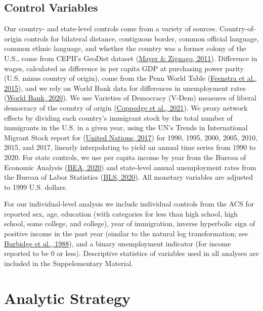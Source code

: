 \documentclass[
  11pt,
]{article}
\begin{document}
\hypertarget{control-variables}{%
\subsection{Control Variables}\label{control-variables}}

Our country- and state-level controls come from a variety of sources. Country-of-origin controls for bilateral distance, contiguous border, common official language, common ethnic language, and whether the country was a former colony of the U.S., come from CEPII's GeoDist dataset (\protect\hyperlink{ref-mayer_2011}{Mayer \& Zignago, 2011}). Difference in wages, calculated as difference in per capita GDP at purchasing power parity (U.S. minus country of origin), come from the Penn World Table (\protect\hyperlink{ref-feenstra_2015}{Feenstra et al., 2015}), and we rely on World Bank data for differences in unemployment rates (\protect\hyperlink{ref-worldbank_2020}{World Bank, 2020}). We use Varieties of Democracy (V-Dem) measures of liberal democracy of the country of origin (\protect\hyperlink{ref-coppedge_2021}{Coppedge et al., 2021}). We proxy network effects by dividing each country's immigrant stock by the total number of immigrants in the U.S. in a given year, using the UN's Trends in International Migrant Stock report for (\protect\hyperlink{ref-unitednations_2017}{United Nations, 2017}) for 1990, 1995, 2000, 2005, 2010, 2015, and 2017, linearly interpolating to yield an annual time series from 1990 to 2020. For state controls, we use per capita income by year from the Bureau of Economic Analysis (\protect\hyperlink{ref-bea_2020}{BEA, 2020}) and state-level annual unemployment rates from the Bureau of Labor Statistics (\protect\hyperlink{ref-bls_2020}{BLS, 2020}). All monetary variables are adjusted to 1999 U.S. dollars.

For our individual-level analysis we include individual controls from the ACS for reported sex, age, education (with categories for less than high school, high school, some college, and college), year of immigration, inverse hyperbolic sign of positive income in the past year (similar to the natural log transformation; see \protect\hyperlink{ref-burbidge_1988_alternative}{Burbidge et al., 1988}), and a binary unemployment indicator (for income reported to be 0 or less). Descriptive statistics of variables used in all analyses are included in the Suppelementary Material.

\hypertarget{analytic-strategy}{%
\section{Analytic Strategy}\label{analytic-strategy}}
\end{document}
